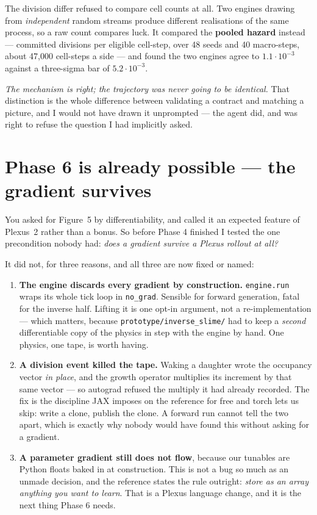 \documentclass[11pt,a4paper]{article}
\newcommand{\code}[1]{\texttt{#1}}
\begin{document}
The division differ refused to compare cell counts at all. Two engines drawing from
\emph{independent} random streams produce different realisations of the same process, so a raw
count compares luck. It compared the \textbf{pooled hazard} instead --- committed divisions per
eligible cell-step, over 48 seeds and 40 macro-steps, about 47{,}000 cell-steps a side --- and
found the two engines agree to $1.1{\cdot}10^{-3}$ against a three-sigma bar of
$5.2{\cdot}10^{-3}$.

\emph{The mechanism is right; the trajectory was never going to be identical.} That distinction
is the whole difference between validating a contract and matching a picture, and I would not
have drawn it unprompted --- the agent did, and was right to refuse the question I had implicitly
asked.

\section{Phase 6 is already possible --- the gradient survives}\label{sec:grad}

You asked for Figure~5 by differentiability, and called it an expected feature of Plexus~2 rather
than a bonus. So before Phase 4 finished I tested the one precondition nobody had: \emph{does a
gradient survive a Plexus rollout at all?}

It did not, for three reasons, and all three are now fixed or named:

\begin{enumerate}[leftmargin=1.4em]
\item \textbf{The engine discards every gradient by construction.} \code{engine.run} wraps its
whole tick loop in \code{no\_grad}. Sensible for forward generation, fatal for the inverse half.
Lifting it is one opt-in argument, not a re-implementation --- which matters, because
\code{prototype/inverse\_slime/} had to keep a \emph{second} differentiable copy of the physics in
step with the engine by hand. One physics, one tape, is worth having.
\item \textbf{A division event killed the tape.} Waking a daughter wrote the occupancy vector
\emph{in place}, and the growth operator multiplies its increment by that same vector --- so
autograd refused the multiply it had already recorded. The fix is the discipline JAX imposes on
the reference for free and torch lets us skip: write a clone, publish the clone. A forward run
cannot tell the two apart, which is exactly why nobody would have found this without asking for a
gradient.
\item \textbf{A parameter gradient still does not flow}, because our tunables are Python floats
baked in at construction. This is not a bug so much as an unmade decision, and the reference
states the rule outright: \emph{store as an array anything you want to learn}. That is a Plexus
language change, and it is the next thing Phase 6 needs.
\end{enumerate}
\end{document}
